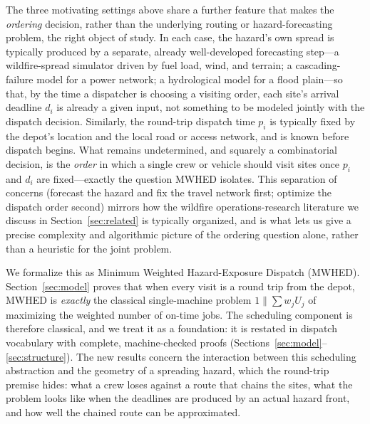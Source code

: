 \documentclass[pdflatex,sn-mathphys-ay]{sn-jnl}
\theoremstyle{thmstyleone}
\theoremstyle{thmstyletwo}
\theoremstyle{thmstylethree}
\begin{document}
The three motivating settings above share a further feature that makes
the \emph{ordering} decision, rather than the underlying routing or
hazard-forecasting problem, the right object of study. In each case,
the hazard's own spread is typically produced by a separate, already
well-developed forecasting step---a wildfire-spread simulator driven by
fuel load, wind, and terrain; a cascading-failure model for a power
network; a hydrological model for a flood plain---so that, by the time
a dispatcher is choosing a visiting order, each site's arrival deadline
$d_i$ is already a given input, not something to be modeled jointly
with the dispatch decision. Similarly, the round-trip dispatch time
$p_i$ is typically fixed by the depot's location and the local road or
access network, and is known before dispatch begins. What remains
undetermined, and squarely a combinatorial decision, is the
\emph{order} in which a single crew or vehicle should visit sites once
$p_i$ and $d_i$ are fixed---exactly the question MWHED isolates. This
separation of concerns (forecast the hazard and fix the travel network
first; optimize the dispatch order second) mirrors how the wildfire
operations-research literature we discuss in Section~\ref{sec:related}
is typically organized, and is what lets us give a precise
complexity and algorithmic picture of the ordering question alone,
rather than a heuristic for the joint problem.

We formalize this as Minimum Weighted Hazard-Exposure Dispatch (MWHED).
Section~\ref{sec:model} proves that when every visit is a round trip from
the depot, MWHED is \emph{exactly} the classical single-machine problem
$1\|\sum w_jU_j$ of maximizing the weighted number of on-time jobs. The
scheduling component is therefore classical, and we treat it as a
foundation: it is restated in dispatch vocabulary with complete,
machine-checked proofs (Sections~\ref{sec:model}--\ref{sec:structure}). The
new results concern the interaction between this scheduling abstraction and
the geometry of a spreading hazard, which the round-trip premise hides: what
a crew loses against a route that chains the sites, what the problem looks
like when the deadlines are produced by an actual hazard front, and how
well the chained route can be approximated.
\end{document}
